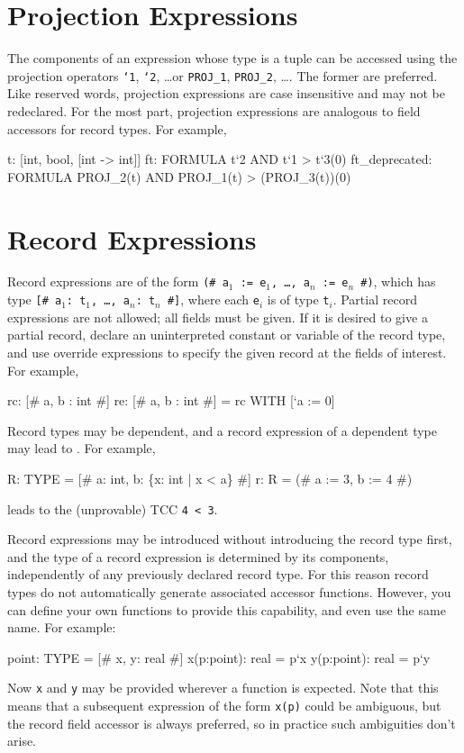 \section{Projection Expressions}\label{projection-exprs}

The components of an expression whose type is a tuple can be accessed
using the projection operators \texttt{`1}, \texttt{`2}, \ldots or
\texttt{PROJ\_1}, \texttt{PROJ\_2}, \ldots.  The former are preferred.
Like reserved words, projection expressions are case insensitive and may
not be redeclared.  For the most part, projection expressions are
analogous to field accessors for record types.  For example,
\begin{pvsex}
  t: [int, bool, [int -> int]]
  ft: FORMULA t`2 AND t`1 > t`3(0)
  ft_deprecated: FORMULA PROJ_2(t) AND PROJ_1(t) > (PROJ_3(t))(0)
\end{pvsex}

\section{Record Expressions}

Record expressions are of the form \texttt{(\# a$_1$ := e$_1$, \ldots,
a$_n$ := e$_n$ \#)}, which has type \texttt{[\# a$_1$:\ t$_1$, \ldots,
a$_n$:\ t$_n$ \#]}, where each \texttt{e$_i$} is of type \texttt{t$_i$}.
Partial record expressions are not allowed; all fields must be given.  If
it is desired to give a partial record, declare an uninterpreted constant
or variable of the record type, and use override expressions to specify
the given record at the fields of interest.  For example,
\begin{pvsex}
  rc: [# a, b : int #]
  re: [# a, b : int #] = rc WITH [`a := 0]
\end{pvsex}

Record types may be dependent, and a record expression of a dependent
type may lead to \tccs.  For example,
\begin{pvsex}
  R: TYPE = [# a: int, b: \{x: int | x < a\} #]
  r: R = (# a := 3, b := 4 #)
\end{pvsex}
%
leads to the (unprovable) TCC \texttt{4 < 3}.

Record expressions may be introduced without introducing the record type
first, and the type of a record expression is determined by its
components, independently of any previously declared record type.  For
this reason record types do not automatically generate associated accessor
functions.  However, you can define your own functions to provide this
capability, and even use the same name.  For example:
\begin{pvsex}
  point: TYPE = [# x, y: real #]
  x(p:point): real = p`x
  y(p:point): real = p`y
\end{pvsex}
Now \texttt{x} and \texttt{y} may be provided wherever a function is
expected.  Note that this means that a subsequent expression of the form
\texttt{x(p)} could be ambiguous, but the record field accessor is always
preferred, so in practice such ambiguities don't arise.

